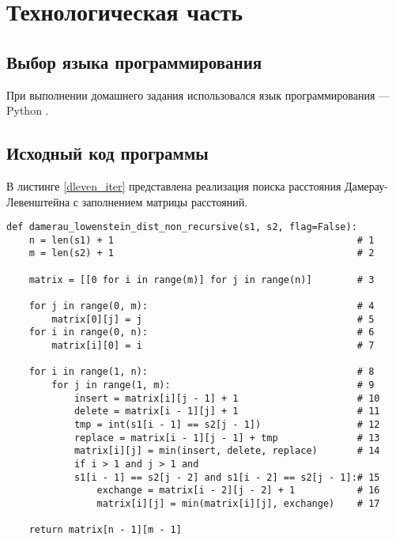 \chapter{Технологическая часть}

\section{Выбор языка программирования}
При выполнении домашнего задания использовался язык программирования --- Python \cite{PythonBook}.

\section{Исходный код программы}
В листинге \ref{dleven_iter} представлена реализация поиска расстояния Дамерау-Левенштейна с заполнением матрицы расстояний.

\captionsetup{singlelinecheck = false, justification=raggedright}
\begin{lstlisting}[caption=Реализация итеративного алгоритма поиска расстояния Дамерау-Левенштейна с заполнением матрицы расстояний,
    label={dleven_iter}]
def damerau_lowenstein_dist_non_recursive(s1, s2, flag=False):
    n = len(s1) + 1                                           # 1
    m = len(s2) + 1                                           # 2

    matrix = [[0 for i in range(m)] for j in range(n)]        # 3

    for j in range(0, m):                                     # 4
        matrix[0][j] = j                                      # 5
    for i in range(0, n):                                     # 6
        matrix[i][0] = i                                      # 7

    for i in range(1, n):                                     # 8
        for j in range(1, m):                                 # 9
            insert = matrix[i][j - 1] + 1                     # 10
            delete = matrix[i - 1][j] + 1                     # 11
            tmp = int(s1[i - 1] == s2[j - 1])                 # 12
            replace = matrix[i - 1][j - 1] + tmp              # 13
            matrix[i][j] = min(insert, delete, replace)       # 14
            if i > 1 and j > 1 and 
            s1[i - 1] == s2[j - 2] and s1[i - 2] == s2[j - 1]:# 15
                exchange = matrix[i - 2][j - 2] + 1           # 16
                matrix[i][j] = min(matrix[i][j], exchange)    # 17

    return matrix[n - 1][m - 1]
\end{lstlisting}
\captionsetup{singlelinecheck = false, justification=centering}

